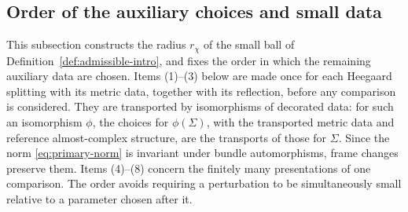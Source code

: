 \documentclass[11pt]{amsart}
\theoremstyle{definition}
\theoremstyle{remark}
\theoremstyle{plain}
\numberwithin{equation}{section}
\begin{document}
\subsection{Order of the auxiliary choices and small data}
\label{subsec:admissible}
This subsection constructs the radius $r_\chi$ of the small ball
of Definition~\ref{def:admissible-intro}, and fixes the order in which
the remaining auxiliary data are chosen.
Items (1)--(3) below are made once for each Heegaard splitting with its metric data, together with its reflection, before any comparison is considered.
They are transported by isomorphisms of decorated data: for such an
isomorphism $\phi$, the choices for $\phi(\Sigma)$, with the
transported metric data and reference almost-complex structure, are
the transports of those for $\Sigma$. Since the norm
\eqref{eq:primary-norm} is invariant under bundle automorphisms, frame
changes preserve them. Items (4)--(8) concern the finitely many
presentations of one comparison. The order avoids requiring a
perturbation to be simultaneously small relative to a parameter chosen
after it.
\end{document}
